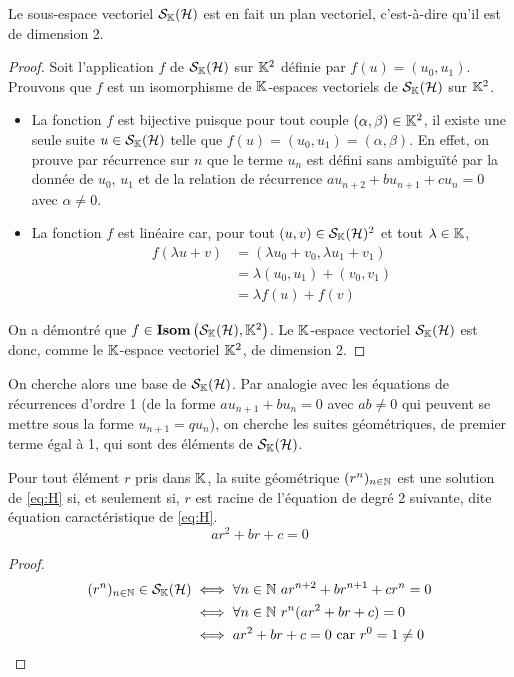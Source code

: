 \begin{prop}
  Le sous-espace vectoriel \(\mathcal{S}_{\mathbb{K}}(\mathcal{H})\) est en fait un plan vectoriel, c'est-à-dire qu'il est de dimension 2.
\end{prop}
\begin{proof}
  Soit l'application \(f\) de \(\mathcal{S}_{\mathbb{K}}(\mathcal{H})\) sur \(\mathbb{K}^2\) définie par \(f(u)=(u_0,u_1)\). Prouvons que \(f\) est un isomorphisme de \(\mathbb{K}\)-espaces vectoriels de \(\mathcal{S}_{\mathbb{K}}(\mathcal{H})\) sur \(\mathbb{K}^2\).
  \begin{itemize}
  \item La fonction \(f\) est bijective puisque pour tout couple \((\alpha, \beta) \in \mathbb{K}^2\), il existe une seule suite \(u \in \mathcal{S}_{\mathbb{K}}(\mathcal{H})\) telle que \(f(u)=(u_0,u_1)=(\alpha,\beta)\). En effet, on prouve par récurrence sur \(n\) que le terme \(u_n\) est défini sans ambiguïté par la donnée de \(u_0\), \(u_1\) et de la relation de récurrence \(au_{n+2}+bu_{n+1}+cu_n=0\) avec \(\alpha \neq 0\).
  \item La fonction \(f\) est linéaire car, pour tout \((u,v) \in \mathcal{S}_{\mathbb{K}}(\mathcal{H})^2\) et tout \(\lambda \in \mathbb{K}\),
    \begin{align}
      f(\lambda u+v) &=(\lambda u_0 +v_0, \lambda u_1+v_1) \\
      &=\lambda (u_0,u_1) +(v_0,v_1)\\
      &=\lambda f(u)+f(v)
    \end{align}
  \end{itemize}
On a démontré que \(f \in \mathbf{Isom}\left(\mathcal{S}_{\mathbb{K}}(\mathcal{H}),\mathbb{K}^2\right)\). Le \(\mathbb{K}\)-espace vectoriel \(\mathcal{S}_{\mathbb{K}}(\mathcal{H})\) est donc, comme le \(\mathbb{K}\)-espace vectoriel \(\mathbb{K}^2\), de dimension 2.
\end{proof}

On cherche alors une base de \(\mathcal{S}_{\mathbb{K}}(\mathcal{H})\). Par analogie avec les équations de récurrences d'ordre 1 (de la forme \(au_{n+1}+bu_n =0\) avec \(ab \neq 0\) qui peuvent se mettre sous la forme \(u_{n+1}=qu_n\)), on cherche les suites géométriques, de premier terme égal à 1, qui sont des éléments de \(\mathcal{S}_{\mathbb{K}}(\mathcal{H})\).

\begin{prop}
  Pour tout élément \(r\) pris dans \(\mathbb{K}\), la suite géométrique \((r^n)_{n \in \mathbb{N}}\) est une solution de \eqref{eq:H} si, et seulement si, \(r\) est racine de l'équation de degré 2 suivante, dite équation caractéristique de \eqref{eq:H}.
  \begin{equation}
    ar^2+br+c=0 \label{eq:EC} \tag{E.C.}
  \end{equation}
\end{prop}
\begin{proof}
  \begin{align}
    (r^n)_{n \in  \N} \in \S_\K(\H) &\iff \forall n \in \N \ ar^{n+2} +br^{n+1}+cr^n = 0 \\
    &\iff \forall n \in \N \ r^n(ar^2+br+c)=0\\
    &\iff ar^2+br+c=0 \text{~car } r^0=1 \neq 0
  \end{align}
\end{proof}

